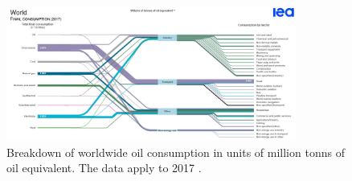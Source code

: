 \begin{figure}
  \centering
  \includegraphics[width=0.85\textwidth]{graphics/IEA_Cons_2017.jpg}
  \caption{Breakdown of worldwide oil consumption in units of million tonns of oil equivalent. The data apply to 2017 \cite{WEO_P_C}.}
  \label{fig:IEA_consumption}
\end{figure}



